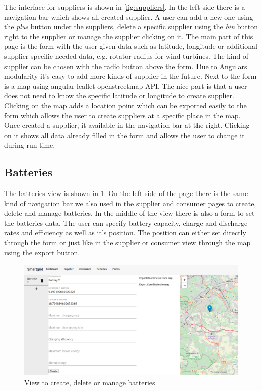 The interface for suppliers is shown in \cref{fig:suppliers}.
In the left side there is a navigation bar which shows all created supplier.
A user can add a new one using the \textit{plus} button under the suppliers, delete a specific supplier using the \textit{bin} button right to the supplier or manage the supplier clicking on it.
The main part of this page is the form with the user given data such as latitude, longitude or additional supplier specific needed data, e.g. rotator radius for wind turbines.
The kind of supplier can be chosen with the radio button above the form.
Due to Angulars modularity it's easy to add more kinds of supplier in the future.
Next to the form is a map using angular leaflet openstreetmap API.
The nice part is that a user does not need to know the specific latitude or longitude to create supplier.
Clicking on the map adds a location point which can be exported easily to the form which allows the user to create suppliers at a specific place in the map.
Once created a supplier, it available in the navigation bar at the right.
Clicking on it shows all data already filled in the form and allows the user to change it during run time.


\subsection{Batteries}
The batteries view is shown in \cref{fig:batteries}.
On the left side of the page there is the same kind of navigation bar we also used in the supplier and consumer pages to create, delete and manage batteries.
In the middle of the view there is also a form to set the batteries data.
The user can specify battery capacity, charge and discharge rates and efficiency as well as it's position.
The position can either set directly through the form or just like in the supplier or consumer view through the map using the export button.

\begin{figure}[!h]
    \centering
    \includegraphics[width=1.00\textwidth]{../figures/batteriesView.PNG}
    \caption{View to create, delete or manage batteries}
    \label{fig:batteries}
\end{figure}


